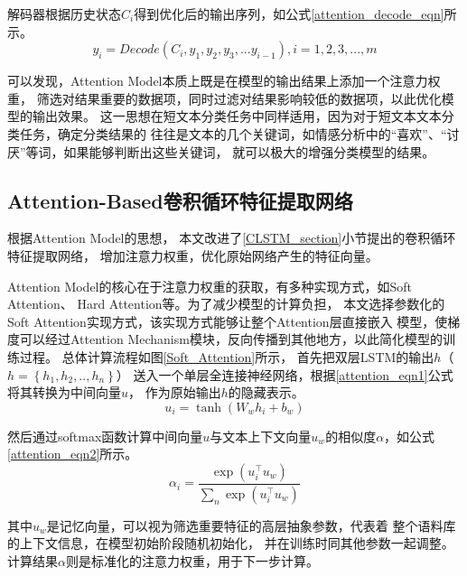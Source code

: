 解码器根据历史状态$C_i$得到优化后的输出序列，如公式\ref{attention_decode_eqn}所示。
\begin{equation}
    y_i=Decode\left ( C_i,y_1,y_2,y_3,...y_{i-1} \right ),i=1,2,3,...,m
    \label{attention_decode_eqn}
\end{equation}

可以发现，Attention Model本质上既是在模型的输出结果上添加一个注意力权重，
筛选对结果重要的数据项，同时过滤对结果影响较低的数据项，以此优化模型的输出效果。
这一思想在短文本分类任务中同样适用，因为对于短文本文本分类任务，确定分类结果的
往往是文本的几个关键词，如情感分析中的“喜欢”、“讨厌”等词，如果能够判断出这些关键词，
就可以极大的增强分类模型的结果。
\subsection{Attention-Based卷积循环特征提取网络}
\label{ACLSTM_section}
根据Attention Model的思想，
本文改进了\ref{CLSTM_section}小节提出的卷积循环特征提取网络，
增加注意力权重，优化原始网络产生的特征向量。

Attention Model的核心在于注意力权重的获取，有多种实现方式，如Soft Attention、
Hard Attention等。为了减少模型的计算负担，
本文选择参数化的Soft Attention实现方式，该实现方式能够让整个Attention层直接嵌入
模型，使梯度可以经过Attention Mechanism模块，反向传播到其他地方，以此简化模型的训练过程。
总体计算流程如图\ref{Soft_Attention}所示，
首先把双层LSTM的输出$h$（$h=\left \{ h_1,h_2,..,h_n\right\}$）
送入一个单层全连接神经网络，根据\ref{attention_eqn1}公式将其转换为中间向量$u$，
作为原始输出$h$的隐藏表示。
\begin{equation}
    u_i=\tanh\left ( W_wh_i+b_w \right )
    \label{attention_eqn1}
\end{equation}

然后通过softmax函数计算中间向量$u$与文本上下文向量$u_w$的相似度$\alpha$，如公式\ref{attention_eqn2}所示。
\begin{equation}
    \alpha_i=\frac{\exp\left ( u_{i}^{\top }u_w \right )}{\sum_n\exp\left ( u_{i}^{\top }u_w \right )}
    \label{attention_eqn2}
\end{equation}

其中$u_w$是记忆向量，可以视为筛选重要特征的高层抽象参数，代表着
整个语料库的上下文信息，在模型初始阶段随机初始化，
并在训练时同其他参数一起调整。计算结果$\alpha$则是标准化的注意力权重，用于下一步计算。

